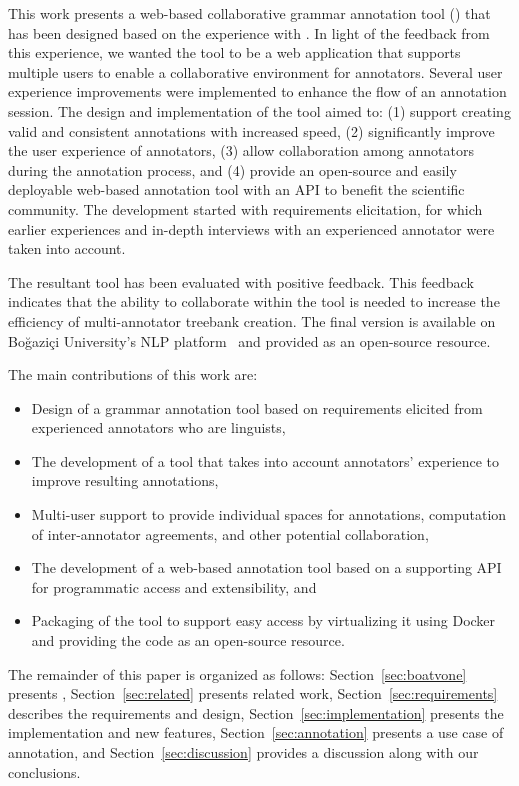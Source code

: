 This work presents a web-based collaborative grammar annotation tool (\boatvtwo) that has been designed based on the experience with \boatvone.
In light of the feedback from this experience, we wanted the tool to be a web application that supports multiple users to enable a collaborative environment for annotators.
Several user experience improvements were implemented to enhance the flow of an annotation session.
The design and implementation of the tool aimed to: (1) support creating valid and consistent annotations with increased speed, (2) significantly improve the user experience of annotators, (3) allow collaboration among annotators during the annotation process, and (4) provide an open-source and easily deployable web-based annotation tool with an API to benefit the scientific community.
The development started with requirements elicitation, for which earlier experiences and in-depth interviews with an experienced annotator were taken into account.

The resultant tool has been evaluated with positive feedback.
This feedback indicates that the ability to collaborate within the tool is needed to increase the efficiency of multi-annotator treebank creation.
The final version is available on Boğaziçi University's NLP platform~\cite{TULAP} and provided as an open-source resource.

The main contributions of this work are:
\begin{itemize}
\setlength\itemsep{0em}
        \item Design of a grammar annotation tool based on requirements elicited from experienced annotators who are linguists,
        \item The development of a tool that takes into account annotators' experience to improve resulting annotations,
        \item Multi-user support to provide individual spaces for annotations, computation of inter-annotator agreements, and other potential collaboration,
        \item The development of a web-based annotation tool based on a supporting API for programmatic access and extensibility, and
        \item Packaging of the tool to support easy access by virtualizing it using Docker~\cite{docker} and providing the code as an open-source resource.
\end{itemize}

The remainder of this paper is organized as follows:
Section~\ref{sec:boatvone} presents \boatvone,
Section~\ref{sec:related} presents related work,
Section~\ref{sec:requirements} describes the requirements and design,
Section~\ref{sec:implementation} presents the implementation and new features,
Section~\ref{sec:annotation} presents a use case of annotation, and
Section~\ref{sec:discussion} provides a discussion along with our conclusions.
